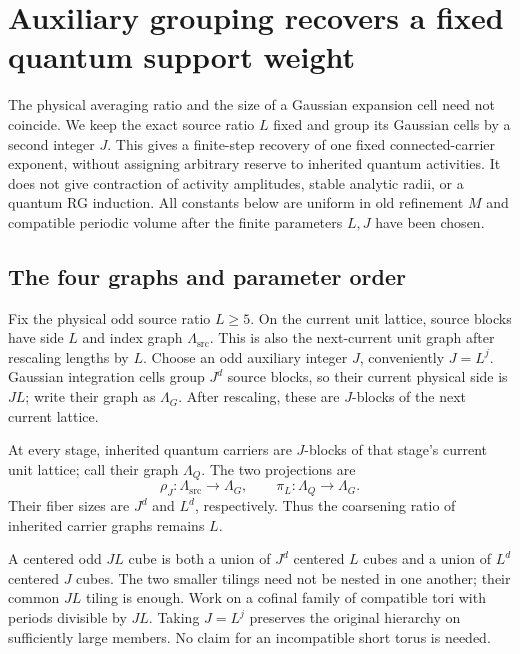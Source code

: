 \section{Auxiliary grouping recovers a fixed quantum support weight}
\label{ag-section}

The physical averaging ratio and the size of a Gaussian expansion
cell need not coincide. We keep the exact source ratio $L$ fixed
and group its Gaussian cells by a second integer $J$. This gives
a finite-step recovery of one fixed connected-carrier exponent,
without assigning arbitrary reserve to inherited quantum activities.
It does not give contraction of activity amplitudes, stable analytic
radii, or a quantum RG induction. All constants below are uniform
in old refinement $M$ and compatible periodic volume after the
finite parameters $L,J$ have been chosen.

\subsection{The four graphs and parameter order}
\label{ag-graphs-section}

Fix the physical odd source ratio $L\ge5$. On the current unit
lattice, source blocks have side $L$ and index graph
$\Lambda_{\mathrm{src}}$. This is also the next-current unit graph
after rescaling lengths by $L$. Choose an odd auxiliary integer
$J$, conveniently $J=L^j$. Gaussian integration cells group
$J^d$ source blocks, so their current physical side is $JL$;
write their graph as $\Lambda_G$. After rescaling, these are
$J$-blocks of the next current lattice.

At every stage, inherited quantum carriers are $J$-blocks of
that stage's current unit lattice; call their graph $\Lambda_Q$.
The two projections are
\begin{equation}\label{ag-projections}
 \rho_J:\Lambda_{\mathrm{src}}\longrightarrow\Lambda_G,
 \qquad
 \pi_L:\Lambda_Q\longrightarrow\Lambda_G.
\end{equation}
Their fiber sizes are $J^d$ and $L^d$, respectively. Thus the
coarsening ratio of inherited carrier graphs remains $L$.

A centered odd $JL$ cube is both a union of $J^d$ centered
$L$ cubes and a union of $L^d$ centered $J$ cubes. The two
smaller tilings need not be nested in one another; their common
$JL$ tiling is enough. Work on a cofinal family of compatible
tori with periods divisible by $JL$. Taking $J=L^j$ preserves
the original hierarchy on sufficiently large members. No claim
for an incompatible short torus is needed.

